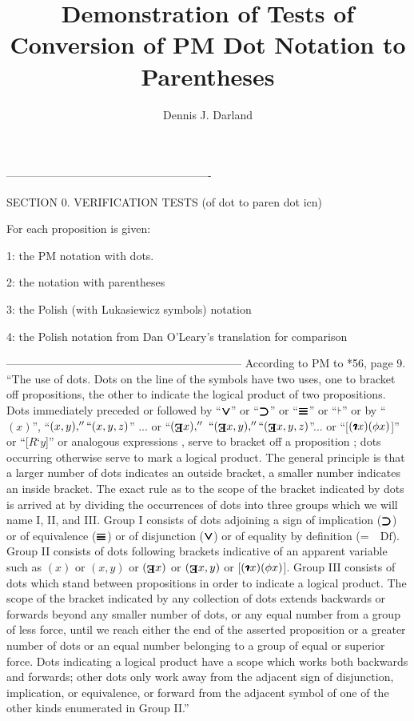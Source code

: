 \documentclass[12pt]{article}
\title{Demonstration of Tests of Conversion of PM Dot Notation to Parentheses}
\author{Dennis J. Darland}
\newcommand{\pmthm}{\mathpunct{\text{\scalebox{.5}[1]{$\boldsymbol\vdash$}}}} %
\newcommand{\pmiddf}{\mathbin{=}}
\newcommand{\pmdf}{\quad \text{Df}}
\newcommand{\pmor}{\mathbin{\ooalign{$\boldsymbol{\vee}\mkern.5mu$\hidewidth\cr$\boldsymbol{\vee}$\cr\hidewidth$\mkern.5mu\boldsymbol{\vee}$}}}
\newcommand{\pmimp}{\mathbin{\ooalign{$\boldsymbol{\supset}\mkern.5mu$\hidewidth\cr$\boldsymbol{\supset}$\cr\hidewidth$\mkern.5mu\boldsymbol{\supset}$}}} %
\newcommand{\pmiff}{\mathbin{\ooalign{$\boldsymbol{\equiv}\mkern.5mu$\hidewidth\cr$\boldsymbol{\equiv}$\cr\hidewidth$\mkern.5mu\boldsymbol{\equiv}$}}} %
\newcommand{\pmall}[1]{(#1)}
\newcommand{\pmsome}[1]{(\text{\raisebox{.5em}{\rotatebox{180}{\textbf{E}}}}#1)} %
\newcommand{\pmpf}[2]{#1#2} %
\newcommand{\pmiota}{\ooalign{\rotatebox[origin=c]{180}{$\boldsymbol{\iota}$}\cr\hidewidth\raisebox{.0125em}{\rotatebox[origin=c]{180}{$\boldsymbol{\iota}$}}\cr\hidewidth\raisebox{.025em}{\rotatebox[origin=c]{180}{$\boldsymbol{\iota}$}}\cr\hidewidth\raisebox{.0375em}{\rotatebox[origin=c]{180}{$\boldsymbol{\iota}$}}\cr\hidewidth\raisebox{.05em}{\rotatebox[origin=c]{180}{$\boldsymbol{\iota}$}}}} %
\newcommand{\pmdsc}[1]{(\pmiota#1)} %
\newcommand{\pmdscf}[2]{#1\textbf{`}#2} %
\begin{document}
\maketitle

-------------------------------------------------------

SECTION 0. VERIFICATION TESTS (of dot to paren dot icn)

For each proposition is given:

1: the PM notation with dots.

2: the notation with parentheses 

3: the Polish (with Lukasiewicz symbols) notation

4: the Polish notation from Dan O'Leary's translation for comparison

---------------------------------------------------------------
According to PM to *56, page 9.
``The use of dots. Dots on the line of the symbols have two uses, one to bracket off propositions, the other to indicate the logical product of two propositions. Dots immediately preceded or followed by ``$\pmor$'' or ``$\pmimp$'' or ``$\pmiff$'' or ``$\pmthm$'' or by ``$\pmall{x}$'', ``$\pmall{x,y},'' ``\pmall{x,y,z}$'' ... or ``$\pmsome{x},''$
$``\pmsome{x,y},'' ``\pmsome{x,y,z}$''... or ``[$\pmdsc{x}(\pmpf{\phi}{x})$]'' or ``[$\pmdscf{R}{y}$]'' or analogous expressions , serve to bracket off a proposition ; dots occurring otherwise serve to mark a logical product. The general principle is that a larger number of dots indicates an outside bracket, a smaller number indicates an inside bracket. The exact rule as to the scope of the bracket indicated by dots is arrived at by dividing the occurrences of dots into three groups which we will name I, II, and III. Group I consists of dots adjoining a sign of implication ($\pmimp$) or of equivalence ($\pmiff$) or of disjunction ($\pmor$) or of equality by definition ($\pmiddf\pmdf$). Group II consists of dots following brackets indicative of an apparent variable such as $\pmall{x}$ or $\pmall{x,y}$ or $\pmsome{x}$ or $\pmsome{x,y}$ or [$\pmdsc{x}(\pmpf{\phi}{x})$]. Group III consists of dots which stand between propositions in order to indicate a logical product. The scope of the bracket indicated by any collection of dots extends backwards or forwards beyond any smaller number of dots, or any equal number from a group of less force, until we reach either the end of the asserted proposition or a  greater number of dots or an equal number belonging to a group of equal or superior force. Dots indicating a logical product have a scope which works both backwards and forwards; other dots only work away from the adjacent sign of disjunction, implication, or equivalence, or forward from the adjacent symbol of one of the other kinds enumerated in Group II.''
\end{document}
